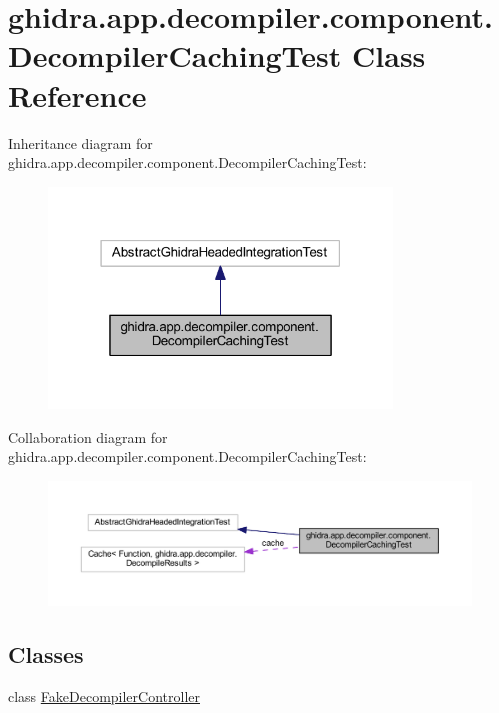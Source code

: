 \hypertarget{classghidra_1_1app_1_1decompiler_1_1component_1_1_decompiler_caching_test}{}\section{ghidra.\+app.\+decompiler.\+component.\+Decompiler\+Caching\+Test Class Reference}
\label{classghidra_1_1app_1_1decompiler_1_1component_1_1_decompiler_caching_test}


Inheritance diagram for ghidra.\+app.\+decompiler.\+component.\+Decompiler\+Caching\+Test\+:
\nopagebreak
\begin{figure}[H]
\begin{center}
\leavevmode
\includegraphics[width=259pt]{classghidra_1_1app_1_1decompiler_1_1component_1_1_decompiler_caching_test__inherit__graph}
\end{center}
\end{figure}


Collaboration diagram for ghidra.\+app.\+decompiler.\+component.\+Decompiler\+Caching\+Test\+:
\nopagebreak
\begin{figure}[H]
\begin{center}
\leavevmode
\includegraphics[width=350pt]{classghidra_1_1app_1_1decompiler_1_1component_1_1_decompiler_caching_test__coll__graph}
\end{center}
\end{figure}
\subsection*{Classes}
\begin{DoxyCompactItemize}
\item 
class \mbox{\hyperlink{classghidra_1_1app_1_1decompiler_1_1component_1_1_decompiler_caching_test_1_1_fake_decompiler_controller}{Fake\+Decompiler\+Controller}}
\end{DoxyCompactItemize}
